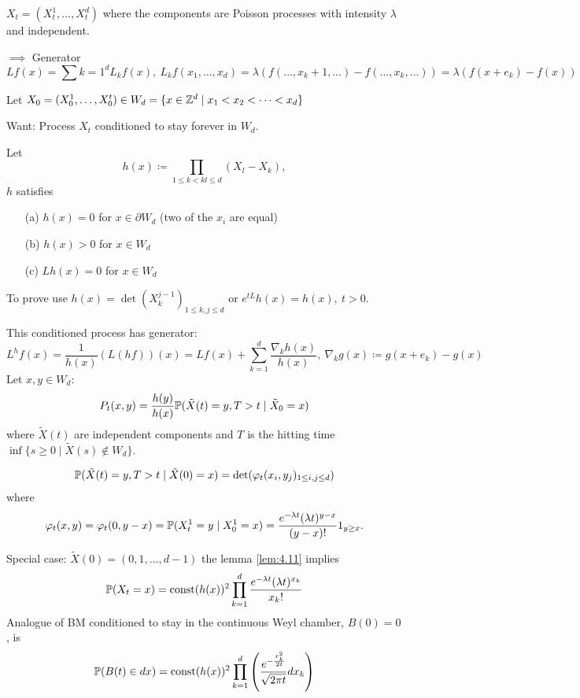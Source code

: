 $X_t=(X_t^1,\dots,X_t^d)$ where the components are Poisson processes with intensity $\lambda$ and independent.

$\implies$ Generator 
\[Lf(x)=\sum{k=1}^d L_kf(x),\ L_k f(x_1,\dots,x_d)=\lambda(f(\dots,x_k+1,\dots)-f(\dots,x_k,\dots))=\lambda(f(x+e_k)-f(x))\]

Let $X_0=(X_0^1,\dots,X_0^t)\in W_d=\{x\in \mathbb{Z}^d\mid x_1<x_2<\dots<x_d\}$

Want: Process $X_t$ conditioned to stay forever in $W_d$.


\begin{lemma}\label{lem:4.10}
    Let \[h(x)\coloneqq \prod_{1\leq k<kl\leq d} (X_l-X_k),\]
    $h$ satisfies 
    \begin{enumerate}
        \item[(a)] $h(x)=0$ for $x\in \partial W_d$ (two of the $x_i$ are equal)
        \item[(b)] $h(x)>0$  for $x \in W_d$
        \item[(c)] $Lh(x)=0$ for $x\in W_d$  
    \end{enumerate}
\end{lemma}

\begin{remark}
    To prove use $h(x)=\det(X_k^{j-1})_{1\leq k,j\leq d}$ or $e^{tL}h(x)=h(x),\ t>0$.
\end{remark}

This conditioned process has generator:
\[L^h f(x)=\frac{1}{h(x)}(L(hf))(x)=Lf(x)+\sum_{k=1}^d\frac{\nabla_k h(x)}{h(x)},\ \nabla_k g(x)\coloneqq g(x+e_k)-g(x)\]
Let $x,y\in W_d$:\begin{align*}
    P_t(x,y)=\frac{h(y)}{h(x)}\mathbb{P}(\tilde{X}(t)=y,T>t\mid \tilde{X}_0=x)
\end{align*}
where $\tilde{X}(t)$ are independent components and $T$ is the hitting time $\inf\{s\geq 0\mid \tilde{X}(s)\notin W_d\}$.

\begin{lemma}\label{lem:4.11}
    \begin{align*}
        \mathbb{P}(\tilde{X}(t)=y,T>t\mid \tilde{X}(0)=x)=\det(\varphi_t(x_i,y_j)_{1\leq i,j\leq d})
    \end{align*}    
    where 
    \[\varphi_t(x,y)=\varphi_t(0,y-x)=\mathbb{P}(X_t^1=y\mid X_0^1=x)=\frac{e^{-\lambda t}(\lambda t)^{y-x}}{(y-x)!}1_{y\geq x}.\]
\end{lemma}

Special case: $\tilde{X}(0)=(0,1,\dots,d-1)$ the lemma \ref{lem:4.11} implies 
\[\mathbb{P}(X_t=x)=\text{const}(h(x))^2\prod_{k=1}^d \frac{e^{-\lambda t}(\lambda t)^{x_k}}{x_k!}\]
Analogue of BM conditioned to stay in the continuous Weyl chamber, $B(0)=0$, is 
\[\mathbb{P}(B(t)\in dx)=\text{const} (h(x))^2\prod_{k=1}^d\left(\frac{e^{-\frac{x_k^2}{2t}}}{\sqrt{2\pi t}}dx_k\right)\]
